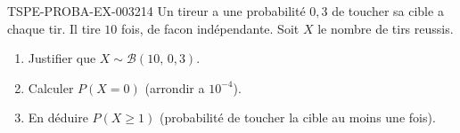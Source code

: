 \begin{exercice}{TSPE-PROBA-EX-003}{2}{14}
Un tireur a une probabilité $0{,}3$ de toucher sa cible a chaque tir. Il tire $10$ fois, de facon indépendante. Soit $X$ le nombre de tirs reussis.
\begin{enumerate}
  \item Justifier que $X \sim \mathcal{B}(10,\,0{,}3)$.
  \item Calculer $P(X=0)$ (arrondir a $10^{-4}$).
  \item En déduire $P(X\geq 1)$ (probabilité de toucher la cible au moins une fois).
\end{enumerate}
\end{exercice}
